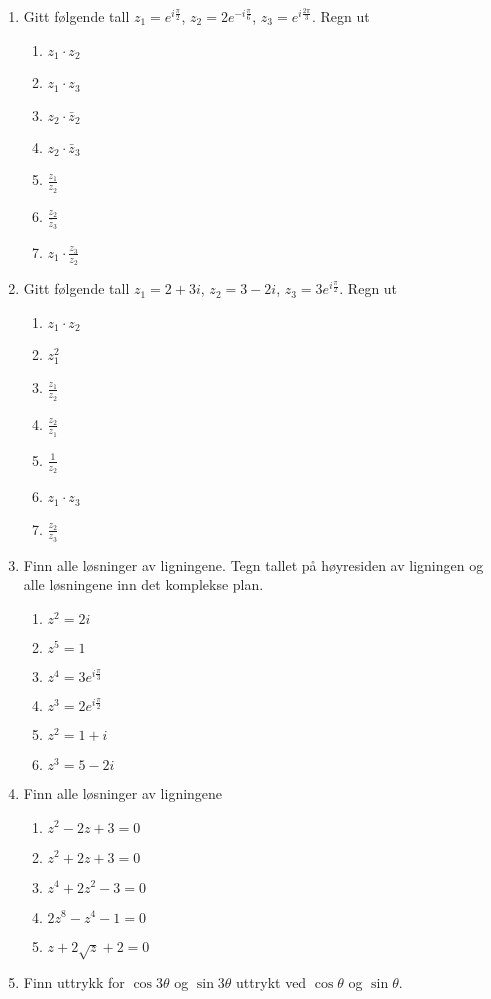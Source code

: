 \documentclass[a4paper,norsk,12pt]{article}
\begin{document}
{\begin{multicols}{2}
\begin{enumerate}
\columnbreak
\item
Gitt følgende tall $z_1 = e^{i\frac{\pi}{2}}$, $z_2 = 2e^{-i\frac{\pi}{6}}$, $z_3 = e^{i\frac{2\pi}{3}}$. Regn ut
\begin{enumerate}[label=\alph*)]
\item
$z_1\cdot z_2$
\item
$z_1 \cdot z_3$
\item
$z_2\cdot\bar{z}_2$
\item
$z_2\cdot \bar{z}_3$
\item
$\frac{z_1}{z_2}$
\item
$\frac{z_2}{\bar{z}_3}$
\item
$z_1\cdot\frac{z_3}{z_2}$
\end{enumerate}
\item
Gitt følgende tall $z_1 = 2+3i$, $z_2=3-2i$, $z_3 = 3e^{i\frac{\pi}{2}}$. Regn ut
\begin{enumerate}[label=\alph*)]
\item
$z_1\cdot z_2$
\item
$z_1^2$
\item
$\frac{z_1}{z_2}$
\item
$\frac{z_2}{z_1}$
\item
$\frac{1}{z_2}$
\item
$z_1\cdot z_3$
\item
$\frac{z_2}{z_3}$
\end{enumerate}
\item
Finn alle løsninger av ligningene. Tegn tallet på høyresiden av ligningen og alle løsningene inn det komplekse plan.
\begin{enumerate}[label=\alph*)]
\item
$z^2 = 2i$
\item
$z^5 = 1$
\item
$z^4 = 3e^{i\frac{\pi}{3}}$
\item
$z^3 = 2e^{i\frac{\pi}{2}}$
\item
$z^2 = 1+i$
\item
$z^3 = 5-2i$
\end{enumerate}
\item
Finn alle løsninger av ligningene
\begin{enumerate}[label=\alph*)]
\item
$z^2 - 2z + 3 = 0 $
\item
$z^2 + 2z + 3 = 0$
\item
$z^4 +2z^2 - 3 = 0$
\item
$2z^8 - z^4 - 1 = 0$
\item
$z  + 2\sqrt{z}+2 = 0$
\end{enumerate}
\item
Finn uttrykk for $\cos3\theta$ og $\sin3\theta$ uttrykt ved $\cos\theta$ og $\sin\theta$. 
\end{enumerate}
\end{multicols}
}
\end{document}
